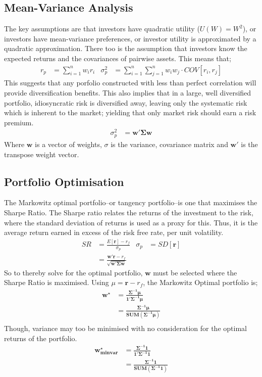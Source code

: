 \documentclass[a4paper]{article}
\begin{document}
\subsection{Mean-Variance Analysis}
The key assumptions are that investors have quadratic utility ($U(W) = W^2$),
or investors have mean-variance preferences, or investor utility is approximated
by a quadratic approximation. There too is the assumption that investors
know the expected returns and the covariances of pairwise assets.
This means that;
\begin{align*}
r_p &= \sum_{i=1}^n w_i r_i & \sigma_p^{2} &= \sum_{i=1}^n \sum_{j=1}^n w_i w_j \cdot COV[r_i,r_j]
\end{align*}
This suggests that any porfolio constructed with less than perfect correlation
will provide diversification benefits. This also implies that in a large,
well diversified portfolio, idiosyncratic risk is diversified away, leaving
only the systematic risk which is inherent to the market; yielding that only
market risk should earn a risk premium.
\begin{align*}
\sigma_p^2 &= \mathbf{w'}\mathbf{\Sigma w}
\end{align*}
Where $\mathbf{w}$ is a vector of weights, $\sigma$ is the variance, covariance
matrix and $\mathbf{w'}$ is the transpose weight vector.
\subsection{Portfolio Optimisation}
The Markowitz optimal portfolio--or tangency portfolio--is one that
maximises the Sharpe Ratio. The Sharpe ratio relates the returns of the
investment to the risk, where the standard deviation of returns is used as
a proxy for this. Thus, it is the average return earned in excess of the risk
free rate, per unit volatility.
\begin{align*}
SR &= \frac{E[\mathbf{r}] - r_f}{\sigma_p} & \sigma_p &= SD[\mathbf{r}]\\
&= \frac{\mathbf{w'r} -r_f}{\sqrt{\mathbf{w'\Sigma w}}} & &
\end{align*}
So to thereby solve for the optimal portfolio, $\mathbf{w}$ must be selected
where the Sharpe Ratio is maximised. Using $\mu = \mathbf{r} -r_f$, the
Markowitz Optimal portfolio is;
\begin{align*}
\mathbf{w^\star} &= \frac{\mathbf{\Sigma^{-1}\mu}}{\mathbf{1'\Sigma^{-1}\mu}}\\
&= \frac{\mathbf{\Sigma^{-1}\mu}}{\mathbf{SUM(\Sigma^{-1}\mu)}}\\
\end{align*}
Though, variance may too be minimised with no consideration for the optimal
returns of the portfolio.
\begin{align*}
\mathbf{w^\star_{minvar}} &= \frac{\mathbf{\Sigma^{-1}1}}{\mathbf{1'\Sigma^{-1}1}}\\
&= \frac{\mathbf{\Sigma^{-1}1}}{\mathbf{SUM(\Sigma^{-1}1)}}\\
\end{align*}
\end{document}

